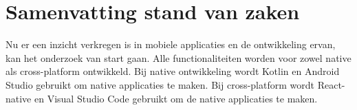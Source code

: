 



\section{Samenvatting stand van zaken}
Nu er een inzicht verkregen is in mobiele applicaties en de ontwikkeling ervan, 
kan het onderzoek van start gaan. Alle functionaliteiten worden voor 
zowel native als cross-platform ontwikkeld. Bij native ontwikkeling wordt 
Kotlin en Android Studio gebruikt om native applicaties te maken. 
Bij cross-platform wordt React-native en Visual Studio Code gebruikt om de 
native applicaties te maken.














